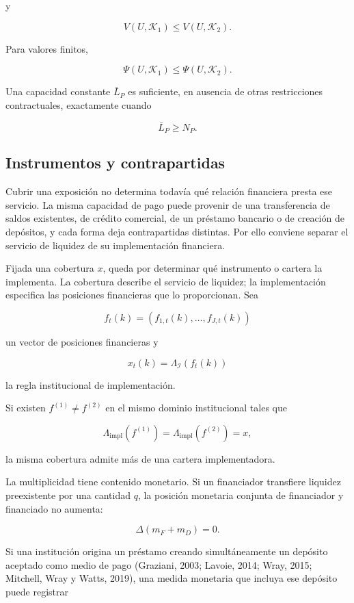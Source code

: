 \documentclass[10pt,a5paper,twoside]{article}
\begin{document}
y

\[
V(U,\mathcal K_1)
\le
V(U,\mathcal K_2).
\]

Para valores finitos,

\[
\Psi(U,\mathcal K_1)
\le
\Psi(U,\mathcal K_2).
\]

Una capacidad constante \(\bar L_P\) es suficiente, en ausencia de otras
restricciones contractuales, exactamente cuando

\[
\bar L_P\ge N_P.
\]

\subsection{Instrumentos y contrapartidas}\label{instrumentos-y-contrapartidas}

Cubrir una exposición no determina todavía qué relación financiera presta ese servicio.
La misma capacidad de pago puede provenir de una transferencia de saldos existentes, de
crédito comercial, de un préstamo bancario o de creación de depósitos, y cada forma deja
contrapartidas distintas. Por ello conviene separar el servicio de liquidez de su
implementación financiera.

Fijada una cobertura \(x\), queda por determinar qué instrumento o
cartera la implementa. La cobertura describe el servicio de liquidez; la
implementación especifica las posiciones financieras que lo proporcionan. Sea

\[
f_t(k)
=
(f_{1,t}(k),\ldots,f_{J,t}(k))
\]

un vector de posiciones financieras y

\[
x_t(k)
=
\Lambda_{\mathcal I}(f_t(k))
\]

la regla institucional de implementación.

Si existen \(f^{(1)}\ne f^{(2)}\) en el mismo dominio institucional
tales que

\[
\Lambda_{\mathrm{impl}}(f^{(1)})
=
\Lambda_{\mathrm{impl}}(f^{(2)})
=
x,
\]

la misma cobertura admite más de una cartera implementadora.

La multiplicidad tiene contenido monetario. Si un financiador transfiere
liquidez preexistente por una cantidad \(q\), la posición monetaria
conjunta de financiador y financiado no aumenta:

\[
\Delta(m_F+m_D)=0.
\]

Si una institución origina un préstamo creando simultáneamente un
depósito aceptado como medio de pago (Graziani, 2003; Lavoie, 2014;
Wray, 2015; Mitchell, Wray y Watts, 2019), una medida monetaria que
incluya ese depósito puede registrar
\end{document}

